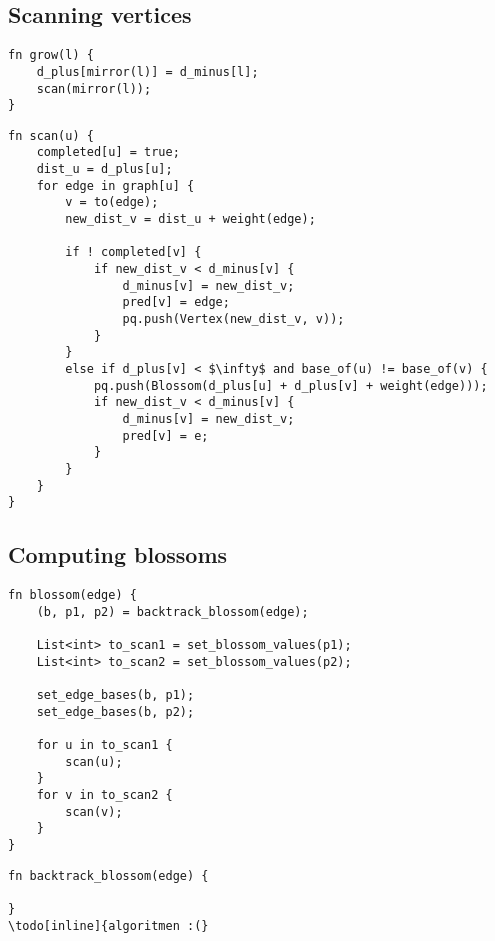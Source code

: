 \subsection{Scanning vertices}
\begin{lstlisting}[caption={Grow},label=Listing,mathescape=true]
fn grow(l) {
    d_plus[mirror(l)] = d_minus[l];
    scan(mirror(l));
}
\end{lstlisting}

\begin{lstlisting}[caption={Scan},label=Listing,mathescape=true]
fn scan(u) {
    completed[u] = true;
    dist_u = d_plus[u];
    for edge in graph[u] {
        v = to(edge);
        new_dist_v = dist_u + weight(edge);

        if ! completed[v] {
            if new_dist_v < d_minus[v] {
                d_minus[v] = new_dist_v;
                pred[v] = edge;
                pq.push(Vertex(new_dist_v, v));
            }
        }
        else if d_plus[v] < $\infty$ and base_of(u) != base_of(v) {
            pq.push(Blossom(d_plus[u] + d_plus[v] + weight(edge)));
            if new_dist_v < d_minus[v] {
                d_minus[v] = new_dist_v;
                pred[v] = e;
            }
        }
    }
}

\end{lstlisting}

\subsection{Computing blossoms}
\begin{lstlisting}[caption={Blossom},label=Listing,mathescape=true]
fn blossom(edge) {
    (b, p1, p2) = backtrack_blossom(edge);

    List<int> to_scan1 = set_blossom_values(p1);
    List<int> to_scan2 = set_blossom_values(p2);

    set_edge_bases(b, p1);
    set_edge_bases(b, p2);

    for u in to_scan1 {
        scan(u);
    }
    for v in to_scan2 {
        scan(v);
    }
}
\end{lstlisting}

\begin{lstlisting}[caption={Backtrack blossom},label=Listing,mathescape=true]
fn backtrack_blossom(edge) {
    
}
\todo[inline]{algoritmen :(}
\end{lstlisting}


